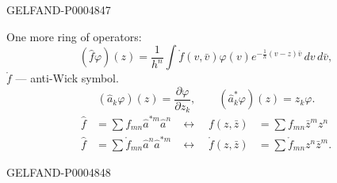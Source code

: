 \begin{GelfandAdjacentEvidence}{GELFAND-P000484}{7}


One more ring of operators:
\[
(\hat f\varphi)(z)=\frac1{h^n}\int
 \mathring{f}(v,\bar v)\varphi(v)
 e^{-\frac1h(v-z)\bar v}\,dv\,d\bar v,
\]
$\mathring{f}$ — anti-Wick symbol.
\[
(\hat a_k\varphi)(z)=\frac{\partial\varphi}{\partial z_k},
\qquad(\hat a_k^*\varphi)(z)=z_k\varphi.
\]
\[
\begin{aligned}
\hat f&=\sum f_{mn}\hat a^{*m}\hat a^n
&\longleftrightarrow\quad
f(z,\bar z)&=\sum f_{mn}\bar z^m z^n\\
\hat f&=\sum\mathring{f}_{mn}\hat a^n\hat a^{*m}
&\longleftrightarrow\quad
\mathring{f}(z,\bar z)&=\sum\mathring{f}_{mn}z^n\bar z^m.
\end{aligned}
\]
\end{GelfandAdjacentEvidence}
\begin{GelfandAdjacentEvidence}{GELFAND-P000484}{8}

\end{GelfandAdjacentEvidence}




